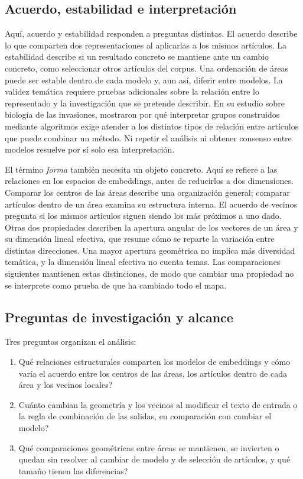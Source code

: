 \documentclass[12pt]{article}
\begin{document}
\subsection{Acuerdo, estabilidad e interpretación}
Aquí, acuerdo y estabilidad responden a preguntas distintas. El acuerdo describe lo que comparten dos representaciones al aplicarlas a los mismos artículos. La estabilidad describe si un resultado concreto se mantiene ante un cambio concreto, como seleccionar otros artículos del corpus. Una ordenación de áreas puede ser estable dentro de cada modelo y, aun así, diferir entre modelos. La validez temática requiere pruebas adicionales sobre la relación entre lo representado y la investigación que se pretende describir. En su estudio sobre biología de las invasiones, \citet{QSSreviewQ17} mostraron por qué interpretar grupos construidos mediante algoritmos exige atender a los distintos tipos de relación entre artículos que puede combinar un método. Ni repetir el análisis ni obtener consenso entre modelos resuelve por sí solo esa interpretación.

El término \emph{forma} también necesita un objeto concreto. Aquí se refiere a las relaciones en los espacios de embeddings, antes de reducirlos a dos dimensiones. Comparar los centros de las áreas describe una organización general; comparar artículos dentro de un área examina su estructura interna. El acuerdo de vecinos pregunta si los mismos artículos siguen siendo los más próximos a uno dado. Otras dos propiedades describen la apertura angular de los vectores de un área y su dimensión lineal efectiva, que resume cómo se reparte la variación entre distintas direcciones. Una mayor apertura geométrica no implica más diversidad temática, y la dimensión lineal efectiva no cuenta temas. Las comparaciones siguientes mantienen estas distinciones, de modo que cambiar una propiedad no se interprete como prueba de que ha cambiado todo el mapa.

\subsection{Preguntas de investigación y alcance}
Tres preguntas organizan el análisis:

\begin{enumerate}
\item[\textbf{PI1.}] \textquestiondown{}Qué relaciones estructurales comparten los modelos de embeddings y cómo varía el acuerdo entre los centros de las áreas, los artículos dentro de cada área y los vecinos locales?
\item[\textbf{PI2.}] \textquestiondown{}Cuánto cambian la geometría y los vecinos al modificar el texto de entrada o la regla de combinación de las salidas, en comparación con cambiar el modelo?
\item[\textbf{PI3.}] \textquestiondown{}Qué comparaciones geométricas entre áreas se mantienen, se invierten o quedan sin resolver al cambiar de modelo y de selección de artículos, y qué tamaño tienen las diferencias?
\end{enumerate}
\end{document}
